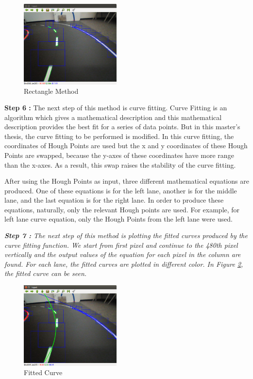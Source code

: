 \begin{figure}[H]
 \centering
  \includegraphics[width=0.45\textwidth]{./Bilder/Case1_Rectangles.png}
	\caption{Rectangle Method}
	\label{fig:Case1_Rectangles}
\end{figure}


\textbf{Step 6 : }The next step of this method is curve fitting. Curve Fitting is an algorithm which gives a mathematical description and this mathematical description provides the best fit for a series of data points. But in this master's thesis, the curve fitting to be performed is modified. In this curve fitting, the coordinates of Hough Points are used but the x and y coordinates of these Hough Points are swapped, because the y-axes of these coordinates have more range than the x-axes. As a result, this swap raises the stability of the curve fitting.

After using the Hough Points as input, three different mathematical equations are produced. One of these equations is for the left lane, another is for the middle lane, and the last equation is for the right lane. In order to produce these equations, naturally, only the relevant Hough points are used. For example, for left lane curve equation, only the Hough Points from the left lane were used.
 
\emph{\color{green}\textbf{Step 7 : }The next step of this method is plotting the fitted curves produced by the curve fitting function. We start from first pixel and continue to the 480th pixel vertically and the output values of the equation for each pixel in the column are found. For each lane, the fitted curves are plotted in different color. In Figure \ref{fig:Case1_CurveFittingwithoutIPM.png}, the fitted curve can be seen.}


\begin{figure}[H]
 \centering
  \includegraphics[width=0.45\textwidth]{./Bilder/Case1_CurveFittingwithoutIPM.png}
	\caption{Fitted Curve}
	\label{fig:Case1_CurveFittingwithoutIPM.png}
\end{figure}



